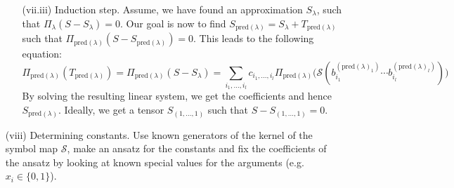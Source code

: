 \documentclass[10pt]{article}
\newcommand*{\sff}{\mathcal{S}}
\newcommand*{\pre}{\mathrm{pred}}
\begin{document}
\begin{itemize}
\begin{itemize}
\item[(vii.iii)] Induction step. Assume, we have found an approximation $S_{\lambda}$, such that $\Pi_{\lambda}(S - S_{\lambda}) = 0$. Our goal is now to find $S_{\pre(\lambda)} = S_{\lambda} + T_{\pre(\lambda)}$ such that $\Pi_{\pre(\lambda)}(S - S_{\pre(\lambda)}) = 0$. This leads to the following equation:
\begin{equation*}
\Pi_{\pre(\lambda)}(T_{\pre(\lambda)}) = \Pi_{\pre(\lambda)}(S - S_{\lambda}) = \sum_{i_1, ..., i_l} c_{i_1, ..., i_l} \Pi_{\pre(\lambda)} \big( \sff (b_{i_1}^{(\pre(\lambda)_1)} \cdots b_{i_l}^{(\pre(\lambda)_l)}) \big)
\end{equation*}
By solving the resulting linear system, we get the coefficients and hence $S_{\pre(\lambda)}$. Ideally, we get a tensor $S_{(1, ..., 1)}$ such that $S - S_{(1, ..., 1)} = 0$.
\end{itemize}

\item[(viii)] Determining constants. Use known generators of the kernel of the symbol map $\sff$, make an ansatz for the constants and fix the coefficients of the ansatz by looking at known special values for the arguments (e.g. $x_i \in \{0, 1\}$).

\end{itemize}
\end{document}
